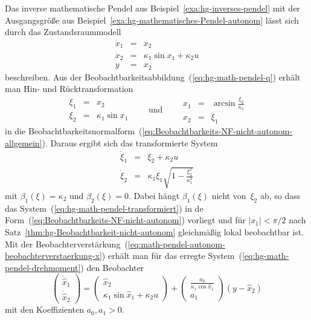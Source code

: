 \begin{example}
\label{exa:hg-mathematisches-Pendel-Drehmoment}Das inverse mathematische
Pendel aus Beispiel~\ref{exa:hg-inverses-pendel} mit der Ausgangsgröße
aus Beispiel~\ref{exa:hg-mathematisches-Pendel-autonom} lässt sich
durch das Zustandsraummodell
\begin{equation}
\begin{array}{lcl}
\dot{x}_{1} & = & x_{2}\\
\dot{x}_{2} & = & \kappa_{1}\sin x_{1}+\kappa_{2}u\\
y & = & x_{2}
\end{array}\label{eq:hg-math-pendel-drehmoment}
\end{equation}
beschreiben. Aus der Beobachtbarkeitsabbildung~(\ref{eq:hg-math-pendel-q})
erhält man Hin- und Rücktransformation 
\[
\begin{array}{lcl}
\xi_{1} & = & x_{2}\\
\xi_{2} & = & \kappa_{1}\sin x_{1}
\end{array}\qquad\text{und}\qquad\begin{array}{lcl}
x_{1} & = & \arcsin\frac{\xi_{2}}{\kappa_{1}}\\
x_{2} & = & \xi_{1}
\end{array}
\]
in die Beobachtbarkeitsnormalform~(\ref{eq:Beobachtbarkeits-NF-nicht-autonom-allgemein}).
Daraus ergibt sich das transformierte System 
\begin{equation}
\begin{array}{lcl}
\dot{\xi}_{1} & = & \xi_{2}+\kappa_{2}u\\
\dot{\xi}_{2} & = & \kappa_{1}\xi_{1}\sqrt{1-\frac{\xi_{2}^{2}}{\kappa_{1}^{2}}}
\end{array}\label{eq:hg-math-pendel-transformiert}
\end{equation}
mit $\beta_{1}(\xi)=\kappa_{2}$ und $\beta_{2}(\xi)=0$. Dabei hängt
$\beta_{1}(\xi)$ nicht von~$\xi_{2}$ ab, so dass das System~(\ref{eq:hg-math-pendel-transformiert})
in de Form~(\ref{eq:Beobachtbarkeits-NF-nicht-autonom}) vorliegt
und für $|x_{1}|<\pi/2$ nach Satz~\ref{thm:hg-Beobachtbarkeit-nicht-autonom}
gleichmäßig lokal beobachtbar ist. Mit der Beobachterverstärkung~(\ref{eq:math-pendel-autonom-beobachterverstaerkung-x})
erhält man für das erregte System~(\ref{eq:hg-math-pendel-drehmoment})
den Beobachter
\[
\left(\begin{array}{l}
\dot{\hat{x}}_{1}\\
\dot{\hat{x}}_{2}
\end{array}\right)=\left(\begin{array}{c}
\hat{x}_{2}\\
\kappa_{1}\sin\hat{x}_{1}+\kappa_{2}u
\end{array}\right)+\left(\begin{array}{c}
\frac{a_{0}}{\kappa_{1}\cos\hat{x}_{1}}\\
a_{1}
\end{array}\right)\left(y-\hat{x}_{2}\right)
\]
mit den Koeffizienten $a_{0},a_{1}>0$.
\end{example}

